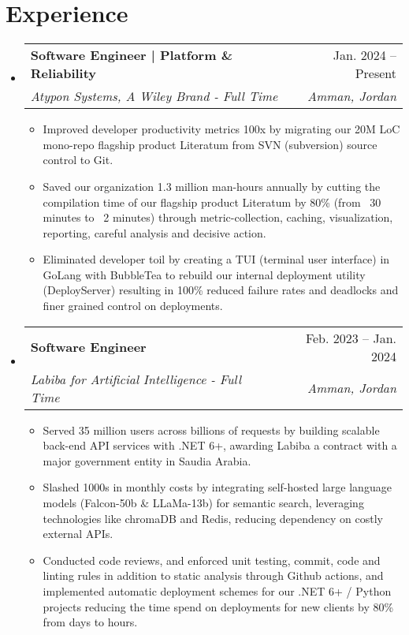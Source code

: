 \documentclass[letterpaper,11pt]{article}
\makeatletter
\newcommand{\resumeItem}[1]{
  \item\small{
    {#1 \vspace{0.5pt}}
  }
}
\newcommand{\resumeSubheading}[4]{
  \vspace{-2pt}\item
    \begin{tabular*}{0.97\textwidth}[t]{l@{\extracolsep{\fill}}r}
      \textbf{#1} & #2 \\
      \textit{\small#3} & \textit{\small #4} \\
    \end{tabular*}\vspace{-7pt}
}
\newcommand{\resumeSubHeadingListStart}{\begin{itemize}[leftmargin=0.0in, label={}]}
\newcommand{\resumeSubHeadingListEnd}{\end{itemize}}
\newcommand{\resumeItemListStart}{\vspace{2pt}\begin{itemize}}
\newcommand{\resumeItemListEnd}{\end{itemize}\vspace{-5pt}}
\makeatother
\begin{document}
\section{Experience}
  \resumeSubHeadingListStart
  \resumeSubheading
      {Software Engineer | Platform \& Reliability}{Jan. 2024 -- Present}
      {Atypon Systems, A Wiley Brand - Full Time}{Amman, Jordan}
      \resumeItemListStart
       \resumeItem{
            Improved developer productivity metrics 100x by migrating our 20M LoC mono-repo flagship product Literatum from SVN (subversion) source control to Git.
        }
        \resumeItem{
            Saved our organization 1.3 million man-hours annually by cutting the compilation time of our flagship product Literatum by 80\% (from ~30 minutes to ~2 minutes) through metric-collection, caching, visualization, reporting, careful analysis and decisive action.
        }
        \resumeItem{
          Eliminated developer toil by creating a TUI (terminal user interface) in GoLang with BubbleTea to rebuild our internal deployment utility (DeployServer) resulting in 100\% reduced failure rates and deadlocks and finer grained control on deployments.
        }
      \resumeItemListEnd
    \resumeSubheading
      {Software Engineer}{Feb. 2023 -- Jan. 2024}
      {Labiba for Artificial Intelligence - Full Time}{Amman, Jordan}
      \resumeItemListStart
      \resumeItem{
        Served 35 million users across billions of requests by building scalable back-end API services with .NET 6+, awarding Labiba a contract with a major government entity in Saudia Arabia.
      }
      \resumeItem{
         Slashed 1000s in monthly costs by integrating self-hosted large language models (Falcon-50b \& LLaMa-13b) for semantic search, leveraging technologies like chromaDB and Redis, reducing dependency on costly external APIs.
      }
    \resumeItem{
        Conducted code reviews, and enforced unit testing, commit, code and linting rules in addition to static analysis through Github actions, and implemented automatic deployment schemes for our .NET 6+ / Python projects reducing the time spend on deployments for new clients by 80\% from days to hours.
    }
      \resumeItemListEnd

  \resumeSubHeadingListEnd
    


\end{document}
